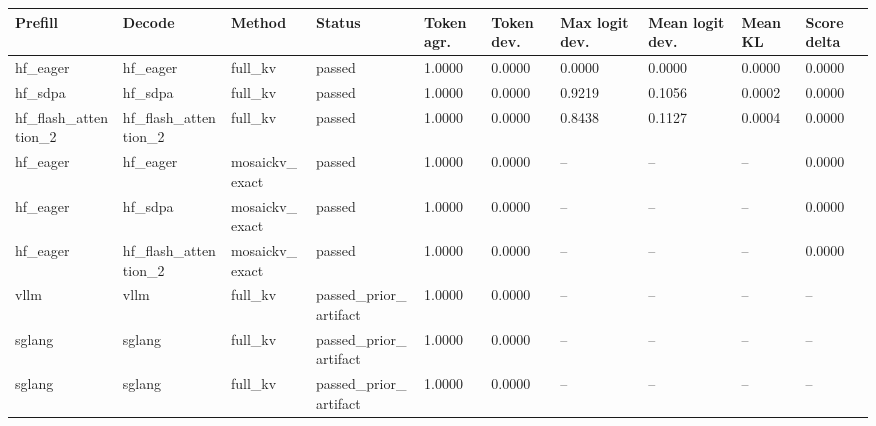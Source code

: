 \begin{tabular}{llllllllll}
\toprule
Prefill & Decode & Method & Status & Token agr. & Token dev. & Max logit dev. & Mean logit dev. & Mean KL & Score delta \\
\midrule
hf\_eager & hf\_eager & full\_kv & passed & 1.0000 & 0.0000 & 0.0000 & 0.0000 & 0.0000 & 0.0000 \\
hf\_sdpa & hf\_sdpa & full\_kv & passed & 1.0000 & 0.0000 & 0.9219 & 0.1056 & 0.0002 & 0.0000 \\
hf\_flash\_attention\_2 & hf\_flash\_attention\_2 & full\_kv & passed & 1.0000 & 0.0000 & 0.8438 & 0.1127 & 0.0004 & 0.0000 \\
hf\_eager & hf\_eager & mosaickv\_exact & passed & 1.0000 & 0.0000 & -- & -- & -- & 0.0000 \\
hf\_eager & hf\_sdpa & mosaickv\_exact & passed & 1.0000 & 0.0000 & -- & -- & -- & 0.0000 \\
hf\_eager & hf\_flash\_attention\_2 & mosaickv\_exact & passed & 1.0000 & 0.0000 & -- & -- & -- & 0.0000 \\
vllm & vllm & full\_kv & passed\_prior\_artifact & 1.0000 & 0.0000 & -- & -- & -- & -- \\
sglang & sglang & full\_kv & passed\_prior\_artifact & 1.0000 & 0.0000 & -- & -- & -- & -- \\
sglang & sglang & full\_kv & passed\_prior\_artifact & 1.0000 & 0.0000 & -- & -- & -- & -- \\
\bottomrule
\end{tabular}
